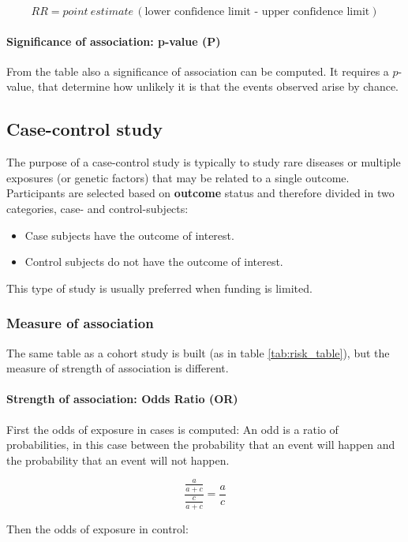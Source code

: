 			$$RR = point\ estimate \,(\text{lower confidence limit - upper confidence limit})$$


			\paragraph{Significance of association: p-value (P)}
			From the table also a significance of association can be computed.
			It requires a $p$-value, that determine how unlikely it is that the events observed arise by chance.

	\subsection{Case-control study}
	The purpose of a case-control study is typically to study rare diseases or multiple exposures (or genetic factors) that may be related to a single outcome.
	Participants are selected based on \textbf{outcome} status and therefore divided in two categories, case- and control-subjects:

	\begin{multicols}{2}
		\begin{itemize}
			\item Case subjects have the outcome of interest.
			\item Control subjects do not have the outcome of interest.
		\end{itemize}
	\end{multicols}

	This type of study is usually preferred when funding is limited.

		\subsubsection{Measure of association}
		The same table as a cohort study is built (as in table \ref{tab:risk_table}), but the measure of strength of association is different.

		\paragraph{Strength of association: Odds Ratio (OR)}
		First the odds of exposure in cases is computed:
		An odd is a ratio of probabilities, in this case between the probability that an event will happen and the probability that an event will not happen.

		$$\frac{\frac{a}{a+c}}{\frac{c}{a+c}} = \frac{a}{c}$$

		Then the odds of exposure in control:


